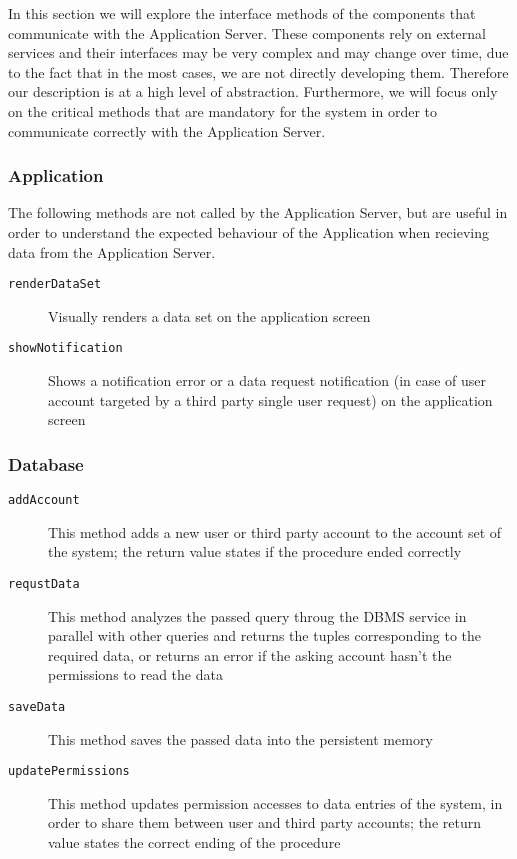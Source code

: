 \documentclass[../DD0.tex]{subfiles}
\begin{document}
    In this section we will explore the interface methods of the components that communicate with the Application Server. These components rely on external services and their interfaces may be very complex and may change over time, due to the fact that in the most cases, we are not directly developing them. Therefore our description is at a high level of abstraction. Furthermore, we will focus only on the critical methods that are mandatory for the system in order to communicate correctly with the Application Server.

    \subsubsection{Application}

      The following methods are not called by the Application Server, but are useful in order to understand the expected behaviour of the Application when recieving data from the Application Server.

      \begin{description}
        \item[\texttt{renderDataSet}] Visually renders a data set on the application screen
        \item[\texttt{showNotification}] Shows a notification error or a data request notification (in case of user account targeted by a third party single user request) on the application screen
      \end{description}

    \subsubsection{Database}

      \begin{description}
        \item[\texttt{addAccount}] This method adds a new user or third party account to the account set of the system; the return value states if the procedure ended correctly
        \item[\texttt{requstData}] This method analyzes the passed query throug the DBMS service in parallel with other queries and returns the tuples corresponding to the required data, or returns an error if the asking account hasn't the permissions to read the data
        \item[\texttt{saveData}] This method saves the passed data into the persistent memory
        \item[\texttt{updatePermissions}] This method updates permission accesses to data entries of the system, in order to share them between user and third party accounts; the return value states the correct ending of the procedure
      \end{description}
\end{document}
